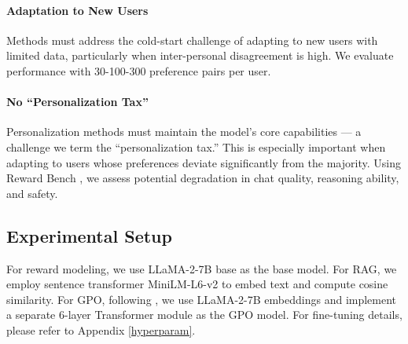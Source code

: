 \paragraph{Adaptation to New Users} 
Methods must address the cold-start challenge of adapting to new users with limited data, particularly when inter-personal disagreement is high. We evaluate performance with 30-100-300 preference pairs per user.

\paragraph{No ``Personalization Tax''} 
Personalization methods must maintain the model's core capabilities — a challenge we term the ``personalization tax.'' This is especially important when adapting to users whose preferences deviate significantly from the majority. Using Reward Bench \cite{lambert2024rewardbench}, we assess potential degradation in chat quality, reasoning ability, and safety.



\subsection{Experimental Setup} 
For reward modeling, we use LLaMA-2-7B base \cite{touvron2023llama} as the base model. For RAG, we employ sentence transformer MiniLM-L6-v2 \cite{reimers-2019-sentence-bert} to embed text and compute cosine similarity. For GPO, following \cite{zhao_group_2023}, we use LLaMA-2-7B embeddings and implement a separate 6-layer Transformer module as the GPO model. For fine-tuning details, please refer to Appendix \ref{hyperparam}.



